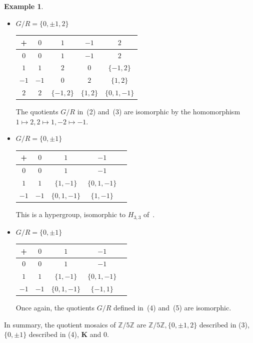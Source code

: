 \documentclass[reqno]{amsart}
\newcommand{\K}{\mathbf{K}}
\numberwithin{equation}{section}
\theoremstyle{plain}
\theoremstyle{definition}
\newtheorem{example}[equation]{Example}
\begin{document}
\begin{example}
\begin{itemize}
\begin{center}
\begin{tabular}{ |c|c|c|c|c| }
\hline
$-2$ & $-2$ & $\{1, 2\}$ & $0$
& $1$\\ 
\hline
\end{tabular}
\end{center}
Notice that $1+(2+2) \neq (1+2)+2$, so this is not a hypergroup.
\item[(3)] $G/R=\{0, \pm1, 2\}$ \begin{center}
\begin{tabular}{ |c|c|c|c|c| } 
\hline
+ & $0$ & $1$ & $-1$ & $2$ \\
\hline
$0$ & $0$ & $1$ & $-1$ & $2$ \\ 
\hline
$1$ & $1$ & $2$ & $0$
& $\{-1, 2\}$\\ 
\hline
$-1$ & $-1$ & $0$ & $2$
& $\{1, 2\}$\\ 
\hline
$2$ & $2$ & $\{-1, 2\}$ & $\{1, 2\}$
& $\{0, 1, -1\}$\\ 
\hline
\end{tabular}
\end{center}   
The quotients $G/R$ in~(2) and~(3) are isomorphic by the homomorphism $1\mapsto 2, 2\mapsto 1, -2\mapsto -1$.
\item[(4)] $G/R=\{0, \pm1\}$ 
\begin{center}
\begin{tabular}{ |c|c|c|c|c| } 
\hline
+ & $0$ & $1$ & $-1$ \\
\hline
$0$ & $0$ & $1$ & $-1$\\ 
\hline
$1$ & $1$ & $\{1, -1\}$ & $\{0, 1, -1\}$
\\ 
\hline
$-1$ & $-1$ & $\{0, 1, -1\}$ & $\{1, -1\}$
\\ 
\hline
\end{tabular}
\end{center} 
This is a hypergroup, isomorphic to $H_{3, 3}$ of~\cite[\S 7.1]{Zieschang}.
\item[(5)] $G/R=\{0, \pm1\}$ 
\begin{center}
\begin{tabular}{ |c|c|c|c|c| } 
\hline
+ & $0$ & $1$ & $-1$ \\
\hline
$0$ & $0$ & $1$ & $-1$\\ 
\hline
$1$ & $1$ & $\{1, -1\}$ & $\{0, 1, -1\}$
\\ 
\hline
$-1$ & $-1$ & $\{0, 1, -1\}$ & $\{-1, 1\}$
\\ 
\hline
\end{tabular}
\end{center}  
Once again, the quotients $G/R$ defined in~(4) and~(5) are isomorphic. 
\end{itemize}
In summary, the quotient mosaics of $\mathbb{Z}/5\mathbb{Z}$ are $\mathbb{Z}/5\mathbb{Z}, \{0, \pm 1, 2\}$ described in (3), $\{0, \pm1\}$ described in (4), $\K$ and $0$.
\end{example}
\end{document}
